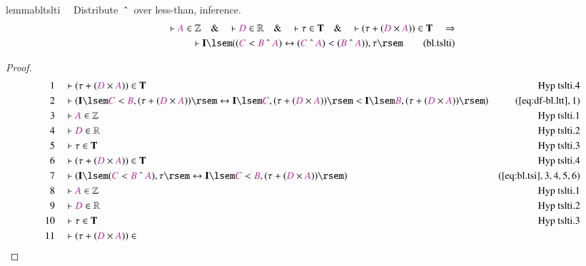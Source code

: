 \begin{restatable}{lemma}{bltslti}~~ Distribute $~\string^~$ over less-than,
inference.
\begin{align}
\vdash \mc{A} \in \mathbb{Z}\quad\&\quad \vdash \mc{D} \in
    \mathbb{R}\quad\&\quad \vdash \tau \in \mathbf{T}\quad\&\quad \vdash ( \tau
    + ( \mc{D} \times \mc{A} ) ) \in \mathbf{T}\quad\Rightarrow \notag \\ %
     \quad \vdash
    \mathbf{I} \lsem ( ( \mc{C} < \mc{B} ~\string^~ \mc{A} ) \leftrightarrow (
    \mc{C} ~\string^~ \mc{A} ) < ( \mc{B} ~\string^~ \mc{A} ) ) , \tau
    \rsem\label{eq:bl.tslti}\tag{bl.tslti}
\end{align}
\end{restatable}

\begin{proof}
\begin{align}
  1 &&  & \vdash ( \tau + ( \mc{D} \times \mc{A} ) ) \in
      \mathbf{T}&\text{Hyp~tslti.4}\notag%
  \\ 2 &&  & \vdash ( \mathbf{I} \lsem \mc{C} < \mc{B} , ( \tau + ( \mc{D}
      \times \mc{A} ) ) \rsem \leftrightarrow \mathbf{I}
      \lsem \mc{C} , ( \tau + ( \mc{D} \times \mc{A} ) )
      \rsem < \mathbf{I} \lsem \mc{B} , ( \tau + ( \mc{D}
      \times \mc{A} ) ) \rsem
      )&(\mbox{\ref{eq:df-bl.ltt}},1)\notag
  \\ 3 &&  & \vdash \mc{A} \in \mathbb{Z}&\text{Hyp~tslti.1}\notag%
  \\ 4 &&  & \vdash \mc{D} \in \mathbb{R}&\text{Hyp~tslti.2}\notag%
  \\ 5 &&  & \vdash \tau \in \mathbf{T}&\text{Hyp~tslti.3}\notag%
  \\ 6 &&  & \vdash ( \tau + ( \mc{D} \times \mc{A} ) ) \in
      \mathbf{T}&\text{Hyp~tslti.4}\notag%
  \\ 7 &&  & \vdash ( \mathbf{I} \lsem ( \mc{C} < \mc{B} ~\string^~ \mc{A} ) ,
      \tau \rsem \leftrightarrow \mathbf{I} \lsem \mc{C} <
      \mc{B} , ( \tau + ( \mc{D} \times \mc{A} ) ) \rsem
      )&(\mbox{\ref{eq:bl.tsi}},3,4,5,6)\notag
  \\ 8 &&  & \vdash \mc{A} \in \mathbb{Z}&\text{Hyp~tslti.1}\notag%
  \\ 9 &&  & \vdash \mc{D} \in \mathbb{R}&\text{Hyp~tslti.2}\notag%
  \\ 10 &&  & \vdash \tau \in \mathbf{T}&\text{Hyp~tslti.3}\notag%
  \\ 11 &&  & \vdash ( \tau + ( \mc{D} \times \mc{A} ) ) \in

\end{align}
\end{proof}
